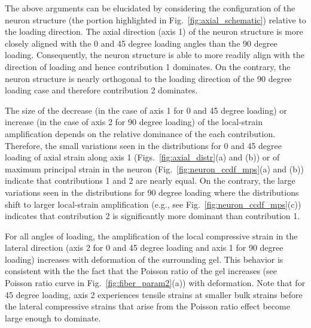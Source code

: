 \documentclass[10pt]{asme2ej}
\begin{document}
The above arguments can be elucidated by considering the configuration of the neuron structure (the portion highlighted in Fig.\ \ref{fig:axial_schematic}) relative to the loading direction. The axial direction (axis 1) of the neuron structure is more closely aligned with the 0 and 45 degree loading angles than the 90 degree loading. Consequently, the neuron structure is able to more readily align with the direction of loading and hence contribution 1 dominates. On the contrary, the neuron structure is nearly orthogonal to the loading direction of the 90 degree loading case and therefore contribution 2 dominates.

The size of the decrease (in the case of axis 1 for 0 and 45 degree loading) or increase (in the case of axis 2 for 90 degree loading) of the local-strain amplification depends on the relative dominance of the each contribution. Therefore, the small variations seen in the distributions for 0 and 45 degree loading of axial strain along axis 1 (Figs.\ \ref{fig:axial_distr}(a) and (b)) or of maximum principal strain in the neuron (Fig.\ \ref{fig:neuron_ccdf_mps}(a) and (b)) indicate that contributions 1 and 2 are nearly equal. On the contrary, the large variations seen in the distributions for 90 degree loading where the distributions shift to larger local-strain amplification (e.g., see Fig.\ \ref{fig:neuron_ccdf_mps}(c)) indicates that contribution 2 is significantly more dominant than contribution 1. 

For all angles of loading, the amplification of the local compressive strain in the lateral direction (axis 2 for 0 and 45 degree loading and axis 1 for 90 degree loading) increases with deformation of the surrounding gel. This behavior is consistent with the the fact that the Poisson ratio of the gel increases (see Poisson ratio curve in Fig.\ \ref{fig:fiber_param2}(a)) with deformation. Note that for 45 degree loading, axis 2 experiences tensile strains at smaller bulk strains before the lateral compressive strains that arise from the Poisson ratio effect become large enough to dominate.
\end{document}
